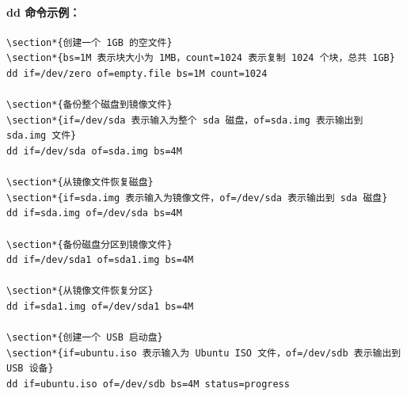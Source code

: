 \documentclass[12pt,UTF8]{ctexbook}
\begin{document}
\paragraph{dd 命令示例：}
\begin{verbatim}
\section*{创建一个 1GB 的空文件}
\section*{bs=1M 表示块大小为 1MB，count=1024 表示复制 1024 个块，总共 1GB}
dd if=/dev/zero of=empty.file bs=1M count=1024

\section*{备份整个磁盘到镜像文件}
\section*{if=/dev/sda 表示输入为整个 sda 磁盘，of=sda.img 表示输出到 sda.img 文件}
dd if=/dev/sda of=sda.img bs=4M

\section*{从镜像文件恢复磁盘}
\section*{if=sda.img 表示输入为镜像文件，of=/dev/sda 表示输出到 sda 磁盘}
dd if=sda.img of=/dev/sda bs=4M

\section*{备份磁盘分区到镜像文件}
dd if=/dev/sda1 of=sda1.img bs=4M

\section*{从镜像文件恢复分区}
dd if=sda1.img of=/dev/sda1 bs=4M

\section*{创建一个 USB 启动盘}
\section*{if=ubuntu.iso 表示输入为 Ubuntu ISO 文件，of=/dev/sdb 表示输出到 USB 设备}
dd if=ubuntu.iso of=/dev/sdb bs=4M status=progress


\end{verbatim}
\end{document}
